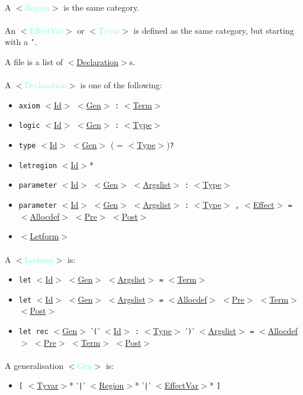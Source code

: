 \documentclass[a4paper]{scrreprt}
\newcommand{\cat}[1]{$<$\hyperref[#1]{#1}$>$}
\newcommand{\likecat}[1]{$<$\textcolor{Aquamarine}{#1}$>$}
\newcommand{\catdef}[1]{\label{#1}\likecat{#1}}
\begin{document}
\paragraph{}
A \catdef{Region} is the same category.

\paragraph{}
An \catdef{EffectVar} or \catdef{Tyvar} is defined as the same category,
but starting with a {\tt '}.

A file is a list of \cat{Declaration}s.

\paragraph{}
A \catdef{Declaration} is one of the following:
\begin{itemize}
  \item {\tt axiom} \cat{Id} \cat{Gen} {\tt :} \cat{Term}
  \item {\tt logic} \cat{Id} \cat{Gen} {\tt :} \cat{Type}
  \item {\tt type} \cat{Id} \cat{Gen}  ( = \cat{Type}){\tt ?}
  \item {\tt letregion} \cat{Id}*
  \item {\tt parameter} \cat{Id} \cat{Gen} \cat{Argslist} {\tt :} \cat{Type}
  \item {\tt parameter} \cat{Id} \cat{Gen} \cat{Argslist} {\tt :} \cat{Type}
    {\tt ,} \cat{Effect} {\tt =} \cat{Allocdef} {\cat{Pre}} {\cat{Post}}
  \item \cat{Letform}
\end{itemize}

\paragraph{}
A \catdef{Letform} is:
\begin{itemize}
  \item {\tt let} \cat{Id} \cat{Gen} \cat{Argslist} {\tt =} \cat{Term}
  \item {\tt let} \cat{Id} \cat{Gen} \cat{Argslist} {\tt =} \cat{Allocdef} {\cat{Pre}} \cat{Term} {\cat{Post}}
  \item {\tt let rec} \cat{Gen} '{\tt (}' \cat{Id} {\tt :} \cat{Type} '{\tt )}'
    \cat{Argslist} {\tt =} \cat{Allocdef} {\cat{Pre}} \cat{Term} {\cat{Post}}
\end{itemize}

\paragraph{}
A generalisation \catdef{Gen} is:
\begin{itemize}
  \item {\tt [} \cat{Tyvar}* '{\tt |}' \cat{Region}* '{\tt |}' \cat{EffectVar}*
    {\tt ]}
\end{itemize}
\end{document}
